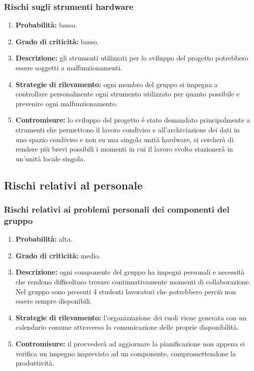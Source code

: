 \subsubsection{Rischi sugli strumenti hardware}
\begin{enumerate}
	\item \textbf{Probabilità:} basso.
	\item \textbf{Grado di criticità:} basso.
	\item \textbf{Descrizione:} gli strumenti utilizzati per lo sviluppo del progetto potrebbero essere soggetti a malfunzionamenti.
	\item \textbf{Strategie di rilevamento:} ogni membro del gruppo si impegna a controllare personalmente ogni strumento utilizzato per quanto possibile e prevenire ogni malfunzionamento.
	\item \textbf{Contromisure:} lo sviluppo del progetto è stato demandato principalmente a strumenti che permettono il lavoro condiviso e all'archiviazione dei dati in uno spazio condiviso e non su una singola unità hardware, si cercherà di rendere più brevi possibili i momenti in cui il lavoro svolto stazionerà in un'unità locale singola.
\end{enumerate}

\subsection{Rischi relativi al personale}
\subsubsection{Rischi relativi ai problemi personali dei componenti del gruppo}
\begin{enumerate}
	\item \textbf{Probabilità:} alta.
	\item \textbf{Grado di criticità:} medio.
	\item \textbf{Descrizione:} ogni componente del gruppo ha impegni personali e necessità che rendono difficoltoso trovare continuativamente momenti di collaborazione. Nel gruppo sono presenti 4 studenti lavoratori che potrebbero perciò non essere sempre disponibili.
	\item \textbf{Strategie di rilevamento:} l'organizzazione dei ruoli viene generata con un calendario comune attraverso la comunicazione delle proprie disponibilità.
	\item \textbf{Contromisure:} il \Responsabile{} provvederà ad aggiornare la pianificazione non appena si verifica un impegno imprevisto ad un componente, compromettendone la produttività.
\end{enumerate}

